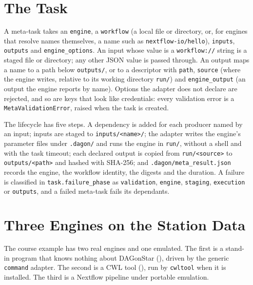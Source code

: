\section{The Task}

A meta-task takes an \texttt{engine}, a \texttt{workflow} (a local file or
directory, or, for engines that resolve names themselves, a name such as
\texttt{nextflow-io/hello}), \texttt{inputs}, \texttt{outputs} and
\texttt{engine\_options}. An input whose value is a \texttt{workflow://} string
is a staged file or directory; any other JSON value is passed through. An
output maps a name to a path below \texttt{outputs/}, or to a descriptor with
\texttt{path}, \texttt{source} (where the engine writes, relative to its
working directory \texttt{run/}) and \texttt{engine\_output} (an output the
engine reports by name). Options the adapter does not declare are rejected, and
so are keys that look like credentials: every validation error is a
\texttt{MetaValidationError}, raised when the task is created.

The lifecycle has five steps. A dependency is added for each producer named by
an input; inputs are staged to \texttt{inputs/<name>/}; the adapter writes the
engine's parameter files under \texttt{.dagon/} and runs the engine in
\texttt{run/}, without a shell and with the task timeout; each declared output
is copied from \texttt{run/<source>} to \texttt{outputs/<path>} and hashed with
SHA-256; and \texttt{.dagon/meta\_result.json} records the engine, the workflow
identity, the digests and the duration. A failure is classified in
\texttt{task.failure\_phase} as \texttt{validation}, \texttt{engine},
\texttt{staging}, \texttt{execution} or \texttt{outputs}, and a failed meta-task
fails its dependants.

\section{Three Engines on the Station Data}

The course example has two real engines and one emulated. The first is a
stand-in program that knows nothing about DAGonStar (),
driven by the generic \texttt{command} adapter. The second is a CWL tool
(), run by \texttt{cwltool} when it is installed. The
third is a Nextflow pipeline under portable emulation.



